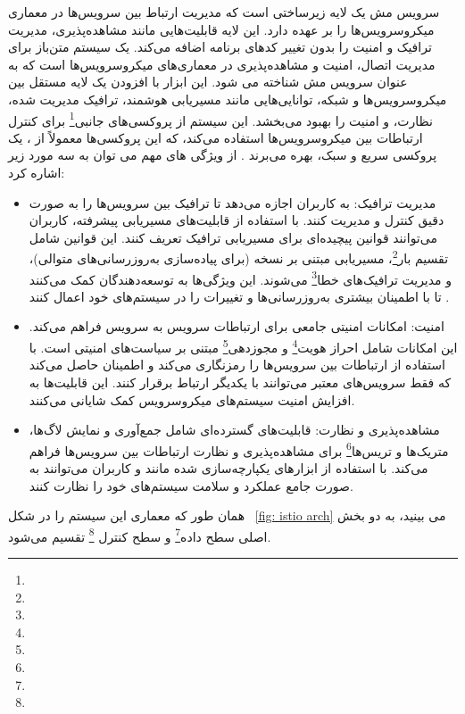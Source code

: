  سرویس مش یک لایه زیرساختی است که مدیریت ارتباط بین سرویس‌ها در معماری میکروسرویس‌ها را بر عهده دارد. این لایه قابلیت‌هایی مانند مشاهده‌پذیری، مدیریت ترافیک و امنیت را بدون تغییر کدهای برنامه اضافه می‌کند.  یک سیستم متن‌باز برای مدیریت اتصال، امنیت و مشاهده‌پذیری در معماری‌های میکروسرویس‌ها است که به عنوان سرویس مش شناخته می شود. این ابزار با افزودن یک لایه مستقل بین میکروسرویس‌ها و شبکه، توانایی‌هایی مانند مسیریابی هوشمند، ترافیک مدیریت شده، نظارت، و امنیت را بهبود می‌بخشد. این سیستم از پروکسی‌های جانبی\footnote{} برای کنترل ارتباطات بین میکروسرویس‌ها استفاده می‌کند، که این پروکسی‌ها معمولاً از ، یک پروکسی سریع و سبک، بهره می‌برند \cite{Istio2}. از ویژگی های مهم  می توان به سه مورد زیر اشاره کرد:
\begin{itemize}
	\item 
مدیریت ترافیک:
 به کاربران اجازه می‌دهد تا ترافیک بین سرویس‌ها را به صورت دقیق کنترل و مدیریت کنند. با استفاده از قابلیت‌های مسیریابی پیشرفته، کاربران می‌توانند قوانین پیچیده‌ای برای مسیریابی ترافیک تعریف کنند. این قوانین شامل تقسیم بار\footnote{}، مسیریابی مبتنی بر نسخه (برای پیاده‌سازی به‌روزرسانی‌های متوالی)، و مدیریت ترافیک‌های خطا\footnote{} می‌شوند. این ویژگی‌ها به توسعه‌دهندگان کمک می‌کنند تا با اطمینان بیشتری به‌روزرسانی‌ها و تغییرات را در سیستم‌های خود اعمال کنند \cite{Istio2}.
 	\item 
 	امنیت:
 	امکانات امنیتی جامعی برای ارتباطات سرویس به سرویس فراهم می‌کند. این امکانات شامل احراز هویت\footnote{} و مجوزدهی\footnote{} مبتنی بر سیاست‌های امنیتی است.  با استفاده از  ارتباطات بین سرویس‌ها را رمزنگاری می‌کند و اطمینان حاصل می‌کند که فقط سرویس‌های معتبر می‌توانند با یکدیگر ارتباط برقرار کنند. این قابلیت‌ها به افزایش امنیت سیستم‌های میکروسرویس کمک شایانی می‌کنند.
 	\item
مشاهده‌پذیری و نظارت:
 قابلیت‌های گسترده‌ای شامل جمع‌آوری و نمایش لاگ‌ها، متریک‌ها و تریس‌ها\footnote{} برای مشاهده‌پذیری و نظارت ارتباطات بین سرویس‌ها فراهم می‌کند. با استفاده از ابزارهای یکپارچه‌سازی شده مانند  و   کاربران می‌توانند به صورت جامع عملکرد و سلامت سیستم‌های خود را نظارت کنند.
 	
\end{itemize} 
 
 همان طور که معماری این سیستم را در شکل 
~\ref{fig: istio arch}
 می بینید،  به دو بخش اصلی سطح داده\footnote{} و سطح کنترل \footnote{} تقسیم می‌شود.
 
